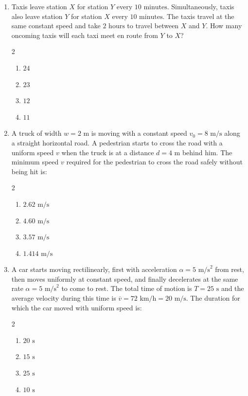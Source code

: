 \documentclass[11pt,a4paper]{article}
\begin{document}
\begin{enumerate}[label=\textbf{\textcolor{l3Crimson}{Q\arabic*.}},leftmargin=24pt,itemsep=10pt,start=51]
  \item Taxis leave station $X$ for station $Y$ every $10\text{ minutes}$. Simultaneously, taxis also leave station $Y$ for station $X$ every $10\text{ minutes}$. The taxis travel at the same constant speed and take $2\text{ hours}$ to travel between $X$ and $Y$. How many oncoming taxis will each taxi meet en route from $Y$ to $X$?
  \begin{multicols}{2}
  \begin{enumerate}[label=\textbf{\textcolor{primaryDark}{(\Alph*)}},itemsep=2pt]
    \item $24$
    \item $23$
    \item $12$
    \item $11$
  \end{enumerate}
  \end{multicols}

  \item A truck of width $w = 2\text{ m}$ is moving with a constant speed $v_0 = 8\text{ m/s}$ along a straight horizontal road. A pedestrian starts to cross the road with a uniform speed $v$ when the truck is at a distance $d = 4\text{ m}$ behind him. The minimum speed $v$ required for the pedestrian to cross the road safely without being hit is:
  \begin{multicols}{2}
  \begin{enumerate}[label=\textbf{\textcolor{primaryDark}{(\Alph*)}},itemsep=2pt]
    \item $2.62\text{ m/s}$
    \item $4.60\text{ m/s}$
    \item $3.57\text{ m/s}$
    \item $1.414\text{ m/s}$
  \end{enumerate}
  \end{multicols}

  \item A car starts moving rectilinearly, first with acceleration $\alpha = 5\text{ m/s}^2$ from rest, then moves uniformly at constant speed, and finally decelerates at the same rate $\alpha = 5\text{ m/s}^2$ to come to rest. The total time of motion is $T = 25\text{ s}$ and the average velocity during this time is $\overline{v} = 72\text{ km/h} = 20\text{ m/s}$. The duration for which the car moved with uniform speed is:
  \begin{multicols}{2}
  \begin{enumerate}[label=\textbf{\textcolor{primaryDark}{(\Alph*)}},itemsep=2pt]
    \item $20\text{ s}$
    \item $15\text{ s}$
    \item $25\text{ s}$
    \item $10\text{ s}$
  \end{enumerate}
  \end{multicols}


\end{enumerate}
\end{document}
